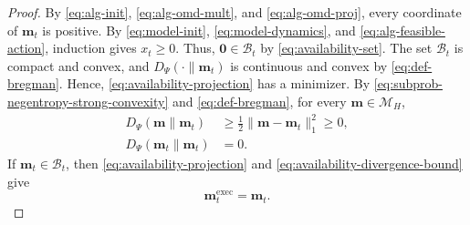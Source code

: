 \documentclass[journal]{IEEEtran}
\theoremstyle{remark}
\begin{document}
\begin{proof}
By \eqref{eq:alg-init}, \eqref{eq:alg-omd-mult}, and
\eqref{eq:alg-omd-proj}, every coordinate of $\mathbf{m}_t$ is positive.
By \eqref{eq:model-init}, \eqref{eq:model-dynamics}, and
\eqref{eq:alg-feasible-action}, induction gives $x_t\ge0$.
Thus, $\mathbf{0}\in\mathcal{B}_t$ by \eqref{eq:availability-set}.
The set $\mathcal{B}_t$ is compact and convex, and
$D_\Psi(\cdot\|\mathbf{m}_t)$ is continuous and convex by
\eqref{eq:def-bregman}. Hence, \eqref{eq:availability-projection} has a
minimizer. By \eqref{eq:subprob-negentropy-strong-convexity} and
\eqref{eq:def-bregman}, for every $\mathbf{m}\in\mathcal{M}_H$,
\begin{equation}
\label{eq:availability-divergence-bound}
\begin{aligned}
D_\Psi(\mathbf{m}\|\mathbf{m}_t)
&\ge\frac12\|\mathbf{m}-\mathbf{m}_t\|_1^2\ge0,\\
D_\Psi(\mathbf{m}_t\|\mathbf{m}_t)&=0.
\end{aligned}
\end{equation}
If $\mathbf{m}_t\in\mathcal{B}_t$, then
\eqref{eq:availability-projection} and
\eqref{eq:availability-divergence-bound} give
\begin{equation}
\label{eq:availability-unclipped-parameter}
\mathbf{m}_t^{\mathrm{exec}}=\mathbf{m}_t.
\end{equation}


\end{proof}
\end{document}
